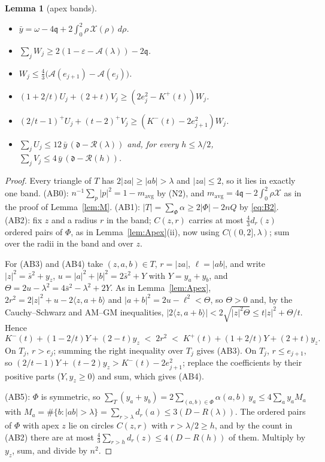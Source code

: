 \documentclass[11pt]{article}
\newcommand{\eps}{\varepsilon}
\newcommand{\cA}{\mathcal{A}}
\newcommand{\cR}{\mathcal{R}}
\newcommand{\cX}{\mathcal{X}}
\newcommand{\dd}{\mathfrak{d}}
\newcommand{\qq}{\mathfrak{q}}
\newcommand{\sbar}{\bar{s}}
\newcommand{\ybar}{\bar{y}}
\newcommand{\mavg}{m_{\mathrm{avg}}}
\newtheorem{lemma}[theorem]{Lemma}
\theoremstyle{remark}
\begin{document}
\begin{lemma}[apex bands]\label{lem:AB}
\begin{itemize}
\item[(AB0)] $\ybar = \omega - 4\qq + 2\int_0^2 \rho\,\cX(\rho)\,d\rho$.
\item[(AB1)] $\sum_j W_j \ge 2(1 - \eps - \cA(\lambda)) - 2\qq$.
\item[(AB2)] $W_j \le \frac43\bigl(\cA(e_{j+1}) - \cA(e_j)\bigr)$.
\item[(AB3)] $(1 + 2/t)U_j + (2+t)V_j \ge (2e_j^2 - K^+(t))W_j$.
\item[(AB4)] $(2/t - 1)^+U_j + (t-2)^+V_j \ge (K^-(t) - 2e_{j+1}^2)W_j$.
\item[(AB5)] $\sum_j U_j \le 12\,\ybar\,(\dd - \cR(\lambda))$ and, for
  every $h \le \lambda/2$, $\sum_j V_j \le 4\,\ybar\,(\dd - \cR(h))$.
\end{itemize}
\end{lemma}

\begin{proof}
Every triangle of $T$ has $2|za| \ge |ab| > \lambda$ and $|za| \le 2$, so it
lies in exactly one band. (AB0): $n^{-1}\sum_p|p|^2 = 1 - \mavg$ by (N2),
and $\mavg = 4\qq - 2\int_0^2\rho\cX$ as in the proof of
Lemma~\ref{lem:M}. (AB1): $|T| = \sum_\Phi\alpha \ge 2|\Phi| - 2nQ$ by
\eqref{eq:B2}. (AB2): fix $z$ and a radius $r$ in the band; $C(z,r)$
carries at most $\frac43 d_r(z)$ ordered pairs of $\Phi$, as in
Lemma~\ref{lem:Apex}(ii), now using $C((0,2],\lambda)$; sum over the radii
in the band and over $z$.

For (AB3) and (AB4) take $(z,a,b) \in T$, $r = |za|$, $\ell = |ab|$, and
write $|z|^2 = \sbar^2 + y_z$, $u = |a|^2 + |b|^2 = 2\sbar^2 + Y$ with
$Y = y_a + y_b$, and $\Theta = 2u - \lambda^2 = 4\sbar^2 - \lambda^2 + 2Y$.
As in Lemma~\ref{lem:Apex}, $2r^2 = 2|z|^2 + u - 2\langle z, a+b\rangle$ and
$|a+b|^2 = 2u - \ell^2 < \Theta$, so $\Theta > 0$ and, by
the Cauchy--Schwarz and AM--GM inequalities,
$|2\langle z,a+b\rangle| < 2\sqrt{|z|^2 \Theta} \le t|z|^2 + \Theta/t$.
Hence
\[
  K^-(t) + (1 - 2/t)Y + (2-t)y_z \;<\; 2r^2 \;<\; K^+(t) + (1+2/t)Y + (2+t)y_z .
\]
On $T_j$, $r > e_j$; summing the right inequality over $T_j$ gives (AB3).
On $T_j$, $r \le e_{j+1}$, so $(2/t - 1)Y + (t-2)y_z > K^-(t) - 2e_{j+1}^2$;
replace the coefficients by their positive parts ($Y, y_z \ge 0$) and sum,
which gives (AB4).

(AB5): $\Phi$ is symmetric, so $\sum_T (y_a + y_b) = 2\sum_{(a,b)\in\Phi}
\alpha(a,b)\,y_a \le 4\sum_a y_a M_a$ with $M_a = \#\{b : |ab| > \lambda\}
= \sum_{r > \lambda} d_r(a) \le 3(D - R(\lambda))$. The ordered pairs of
$\Phi$ with apex $z$ lie on circles $C(z,r)$ with $r > \lambda/2 \ge h$,
and by the count in (AB2) there are at most $\frac43\sum_{r>h} d_r(z) \le
4(D - R(h))$ of them. Multiply by $y_z$, sum, and divide by $n^2$.
\end{proof}
\end{document}

